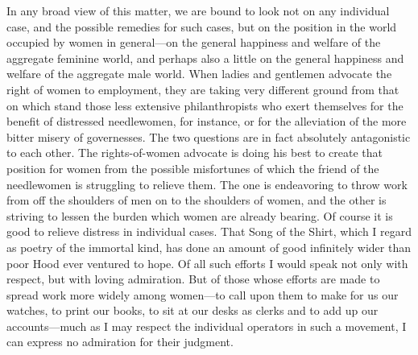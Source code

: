 In any broad view of this matter, we are bound to look not on any
individual case, and the possible remedies for such cases, but on
the position in the world occupied by women in general---on the
general happiness and welfare of the aggregate feminine world, and
perhaps also a little on the general happiness and welfare of the
aggregate male world.  When ladies and gentlemen advocate the right
of women to employment, they are taking very different ground from
that on which stand those less extensive philanthropists who exert
themselves for the benefit of distressed needlewomen, for instance,
or for the alleviation of the more bitter misery of governesses.
The two questions are in fact absolutely antagonistic to each
other.  The rights-of-women advocate is doing his best to create
that position for women from the possible misfortunes of which the
friend of the needlewomen is struggling to relieve them.  The one
is endeavoring to throw work from off the shoulders of men on to
the shoulders of women, and the other is striving to lessen the
burden which women are already bearing.  Of course it is good to
relieve distress in individual cases.  That Song of the Shirt,
which I regard as poetry of the immortal kind, has done an amount
of good infinitely wider than poor Hood ever ventured to hope.  Of
all such efforts I would speak not only with respect, but with
loving admiration.  But of those whose efforts are made to spread
work more widely among women---to call upon them to make for us our
watches, to print our books, to sit at our desks as clerks and to
add up our accounts---much as I may respect the individual operators
in such a movement, I can express no admiration for their judgment.

